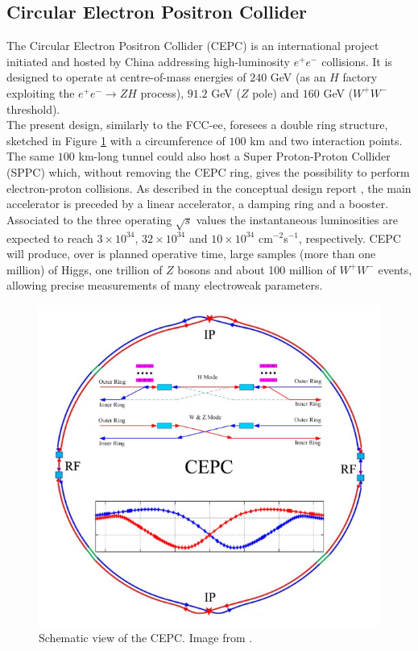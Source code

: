 \subsection*{Circular Electron Positron Collider}
The Circular Electron Positron Collider (CEPC) is an international project initiated and hosted by China addressing high-luminosity $e^+e^-$ collisions. It is designed to operate at centre-of-mass energies of $240$ GeV (as an $H$ factory exploiting the $e^+e^- \rightarrow ZH$ process), $91.2$ GeV ($Z$ pole) and $160$ GeV ($W^+W^-$ threshold).\\

The present design, similarly to the FCC-ee, foresees a double ring structure, sketched in Figure \ref{fig:CEPC} with a circumference of $100$ km and two interaction points. The same $100$ km-long tunnel could also host a Super Proton-Proton Collider (SPPC) which, without removing the CEPC ring, gives the possibility to perform electron-proton collisions. As described in the conceptual design report \cite{CEPC_design1, CEPC_design2}, the main accelerator is preceded by a linear accelerator, a damping ring and a booster.\\
Associated to the three operating $\sqrt{s}$ values the instantaneous luminosities are expected to reach $3 \times 10^{34}$, $32 \times 10^{34}$ and $10 \times 10^{34}$ cm$^{-2}$s$^{-1}$, respectively.
CEPC will produce, over is planned operative time, large samples (more than one million) of Higgs, one trillion of $Z$ bosons and about 100 million of $W^+W^-$ events, allowing precise measurements of many electroweak parameters.\\

\begin{figure}
	\centering
	\includegraphics[width=.65\textwidth]{IMG/Cap1/CEPC.png}
	\caption{Schematic view of the CEPC. Image from \cite{CEPC_design2}.}
	\label{fig:CEPC}
\end{figure}


